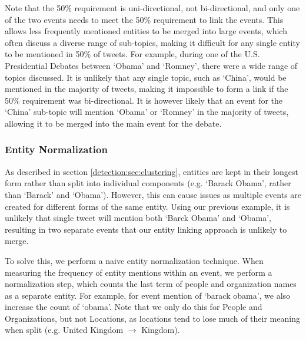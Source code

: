 Note that the 50\% requirement is uni-directional, not bi-directional, and only one of the two events needs to meet the 50\% requirement to link the events.
This allows less frequently mentioned entities to be merged into large events, which often discuss a diverse range of sub-topics, making it difficult for any single entity to be mentioned in 50\% of tweets.
For example, during one of the U.S. Presidential Debates between `Obama' and `Romney', there were a wide range of topics discussed.
It is unlikely that any single topic, such as `China', would be mentioned in the majority of tweets, making it impossible to form a link if the 50\% requirement was bi-directional.
It is however likely that an event for the `China' sub-topic will mention `Obama' or `Romney' in the majority of tweets, allowing it to be merged into the main event for the debate.

\subsubsection{Entity Normalization}
\label{sec:entityNorm}
As described in section \ref{detection:sec:clustering}, entities are kept in their longest form rather than split into individual components (e.g. `Barack Obama', rather than `Barack' and `Obama').
However, this can cause issues as multiple events are created for different forms of the same entity.
Using our previous example, it is unlikely that single tweet will mention both `Barck Obama' and `Obama', resulting in two separate events that our entity linking approach is unlikely to merge.

To solve this, we perform a naive entity normalization technique.
When measuring the frequency of entity mentions within an event, we perform a normalization step, which counts the last term of people and organization names as a separate entity.
For example, for event mention of `barack obama', we also increase the count of `obama'.
Note that we only do this for People and Organizations, but not Locations, as locations tend to lose much of their meaning when split (e.g. United Kingdom $\rightarrow$ Kingdom).